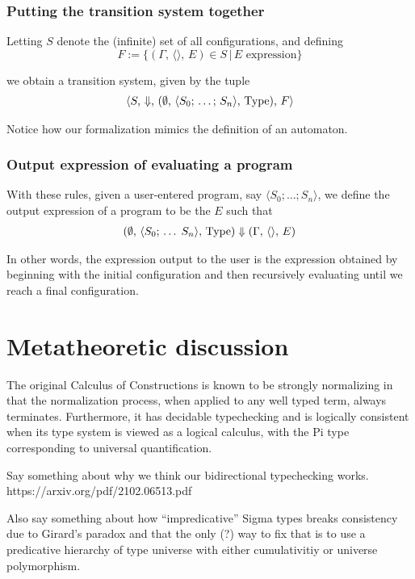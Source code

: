 \documentclass{article}
\begin{document}
\subsubsection{Putting the transition system together}
Letting $S$ denote the (infinite) set of all configurations, and defining
\[ F := \{ (\Gamma, \, \langle \rangle, \, E) \in S \, | \, E \text{ expression} \} \]

we obtain a transition system, given by the tuple
\begin{align*}
  \langle S, \, \Downarrow, \, 
  (\emptyset, \, \langle S_0; \, \dots; \, S_n \rangle, \, \operatorname{Type}), \, F \rangle
\end{align*}

Notice how our formalization mimics the definition of an automaton.

\subsubsection{Output expression of evaluating a program}
With these rules, given a user-entered program, say $\langle S_0;
\dots; S_n \rangle$, we define the
output expression of a program to be the $E$ such that
\begin{align*}
  (\emptyset, \, \langle S_0; \, \dots \; S_n \rangle, \, \operatorname{Type}) \Downarrow
  (\Gamma, \, \langle \rangle, \, E)
\end{align*}

In other words, the expression output to the user is the expression obtained by
beginning with the initial configuration and then recursively evaluating
until we reach a final configuration.

\section{Metatheoretic discussion}
The original Calculus of Constructions is known to be strongly normalizing in
that the normalization process, when applied to any well typed term, always
terminates. Furthermore, it has decidable typechecking and is logically
consistent when its type system is viewed as a logical calculus, with the Pi type
corresponding to universal quantification.


Say something about why we think our bidirectional typechecking works.
https://arxiv.org/pdf/2102.06513.pdf

Also say something about how ``impredicative'' Sigma types breaks consistency
due to Girard's paradox and that the only (?) way to fix that is to use a 
predicative hierarchy of type universe with either cumulativitiy or universe
polymorphism.
\end{document}
